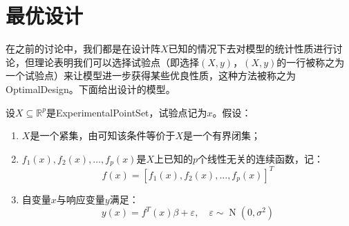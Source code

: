\section{最优设计}
在之前的讨论中，我们都是在设计阵$X$已知的情况下去对模型的统计性质进行讨论，但理论表明我们可以选择试验点（即选择$(X,y)$，$(X,y)$的一行被称之为一个试验点）来让模型进一步获得某些优良性质，这种方法被称之为\gls{OptimalDesign}。下面给出设计的模型。

\begin{definition}\label{model:design}
	设$X\subseteq\mathbb{R}^{p}$是\gls{ExperimentalPointSet}，试验点记为$x$。假设：
	\begin{enumerate}
		\item $X$是一个紧集，由可知该条件等价于$X$是一个有界闭集；
		\item $f_1(x),f_2(x),\dots,f_p(x)$是$X$上已知的$p$个线性无关的连续函数，记：
		\begin{equation*}
			f(x)=[f_1(x),f_2(x),\dots,f_p(x)]^T
		\end{equation*}
		\item 自变量$x$与响应变量$y$满足：
		\begin{equation*}
			y(x)=f^T(x)\beta+\varepsilon,\quad\varepsilon\sim\operatorname{N}(0,\sigma^2)
		\end{equation*}
	\end{enumerate}
\end{definition}
